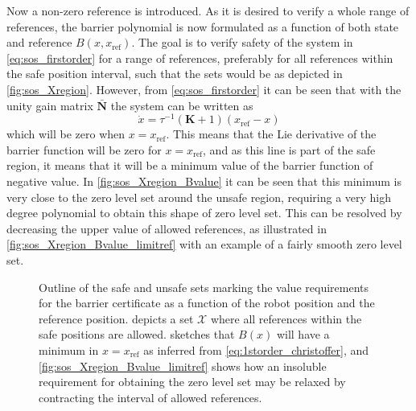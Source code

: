 Now a non-zero reference is introduced. As it is desired to verify a whole range of references, the barrier polynomial is now formulated as a function of both state and reference $B(x,x_\text{ref})$.
The goal is to verify safety of the system in \autoref{eq:sos_firstorder} for a range of references, preferably for all references within the safe position interval, such that the sets would be as depicted in \autoref{fig:sos_Xregion}.
However, from \autoref{eq:sos_firstorder} it can be seen that with the unity gain matrix $\bar{\mathbf{N}}$ the system can be  written as
\begin{equation}
\dot{x} = \tau^{-1}(\mathbf{K}+1)(x_\text{ref}-x)\label{eq:1storder_christoffer}
\end{equation}
which will be zero when $x=x_\text{ref}$. This means that the Lie derivative of the barrier function will be zero for $x=x_\text{ref}$, and as this line is part of the safe region, it means that it will be a minimum value of the barrier function of negative value. In \autoref{fig:sos_Xregion_Bvalue} it can be seen that this minimum is very close to the zero level set around the unsafe region, requiring a very high degree polynomial to obtain this shape of zero level set. This can be resolved by decreasing the upper value of allowed references, as illustrated in \autoref{fig:sos_Xregion_Bvalue_limitref} with an example of a fairly smooth zero level set.

\begin{figure}[htbp]
\centering
{}%
\hspace{3mm}
%
\hspace{3mm}
%
\caption{Outline of the safe and unsafe sets marking the value requirements for the barrier certificate as a function of the robot position and the reference position.  depicts a set $\mathcal{X}$ where all references within the safe positions are allowed.  sketches that $B(x)$ will have a minimum in $x=x_\text{ref}$ as inferred from \autoref{eq:1storder_christoffer}, and \autoref{fig:sos_Xregion_Bvalue_limitref} shows how an insoluble requirement for obtaining the zero level set may be relaxed by contracting the interval of allowed references.}
\label{fig:sets_reference}
\end{figure}

